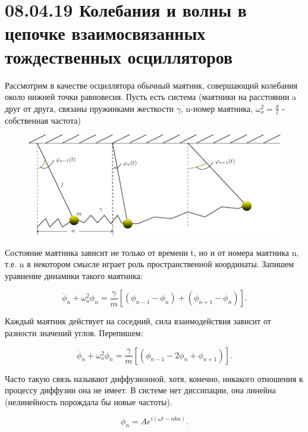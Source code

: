 
\usepackage{graphicx}
\usepackage{wrapfig}
\usepackage{ dsfont }



\section{08.04.19 Колебания и волны в цепочке взаимосвязанных тождественных осцилляторов}

Рассмотрим в качестве осциллятора обычный маятник, совершающий колебания около нижней точки равновесия. Пусть есть система (маятники на расстоянии a друг от друга, связаны пружинками жесткости $\gamma$, n-номер маятника, $\omega_o^2=\frac{g}{l}$ - собственная частота)

\begin{figure}[h!]
	\centering
	\includegraphics[width=0.5\linewidth]{fig/fig1'.pdf}
	\label{fig:fig1}
\end{figure}

Состояние маятника зависит не только от времени t, но и от номера маятника n, т.е. n в некотором смысле играет роль пространственной координаты. Запишем уравнение динамики такого маятника:

\begin{equation}
	\ddot{\phi}_n+\omega^2_o \phi_n=\frac{\gamma}{m}[(\phi_{n-1}-\phi_n)+(\phi_{n+1}-\phi_n)].
	\label{eq:1}
\end{equation}

Каждый маятник действует на соседний, сила взаимодействия зависит от разности значений углов. Перепишем:

\begin{equation*}
	\ddot{\phi}_n+\omega^2_o \phi_n=\frac{\gamma}{m}[(\phi_{n-1}-2\phi_n+\phi_{n+1})].
\end{equation*}

Часто такую связь называют диффузионной, хотя, конечно, никакого отношения к процессу диффузии она не имеет. В системе нет диссипации, она линейна (нелинейность порождала бы новые частоты).

\begin{equation}
	\phi_n=A e^{i(\omega t-nka)}.
	\label{eq:2}
\end{equation}

